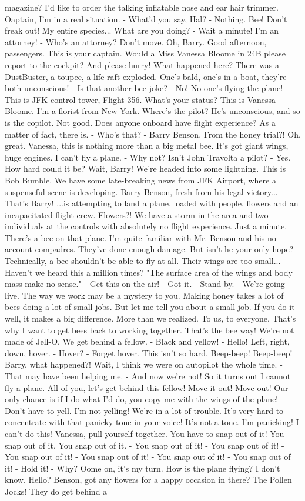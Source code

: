 \documentclass{article}
\begin{document}
magazine? I'd like to order the talking inflatable nose and ear hair trimmer. Oaptain, I'm in a real situation. - What'd you say, Hal? - Nothing. Bee! Don't freak out! My entire species... What are you doing? - Wait a minute! I'm an attorney! - Who's an attorney? Don't move. Oh, Barry. Good afternoon, passengers. This is your captain. Would a Miss Vanessa Bloome in 24B please report to the cockpit? And please hurry! What happened here? There was a DustBuster, a toupee, a life raft exploded. One's bald, one's in a boat, they're both unconscious! - Is that another bee joke? - No! No one's flying the plane! This is JFK control tower, Flight 356. What's your status? This is Vanessa Bloome. I'm a florist from New York. Where's the pilot? He's unconscious, and so is the copilot. Not good. Does anyone onboard have flight experience? As a matter of fact, there is. - Who's that? - Barry Benson. From the honey trial?! Oh, great. Vanessa, this is nothing more than a big metal bee. It's got giant wings, huge engines. I can't fly a plane. - Why not? Isn't John Travolta a pilot? - Yes. How hard could it be? Wait, Barry! We're headed into some lightning. This is Bob Bumble. We have some late-breaking news from JFK Airport, where a suspenseful scene is developing. Barry Benson, fresh from his legal victory... That's Barry! ...is attempting to land a plane, loaded with people, flowers and an incapacitated flight crew. Flowers?! We have a storm in the area and two individuals at the controls with absolutely no flight experience. Just a minute. There's a bee on that plane. I'm quite familiar with Mr. Benson and his no-account compadres. They've done enough damage. But isn't he your only hope? Technically, a bee shouldn't be able to fly at all. Their wings are too small... Haven't we heard this a million times? "The surface area of the wings and body mass make no sense." - Get this on the air! - Got it. - Stand by. - We're going live. The way we work may be a mystery to you. Making honey takes a lot of bees doing a lot of small jobs. But let me tell you about a small job. If you do it well, it makes a big difference. More than we realized. To us, to everyone. That's why I want to get bees back to working together. That's the bee way! We're not made of Jell-O. We get behind a fellow. - Black and yellow! - Hello! Left, right, down, hover. - Hover? - Forget hover. This isn't so hard. Beep-beep! Beep-beep! Barry, what happened?! Wait, I think we were on autopilot the whole time. - That may have been helping me. - And now we're not! So it turns out I cannot fly a plane. All of you, let's get behind this fellow! Move it out! Move out! Our only chance is if I do what I'd do, you copy me with the wings of the plane! Don't have to yell. I'm not yelling! We're in a lot of trouble. It's very hard to concentrate with that panicky tone in your voice! It's not a tone. I'm panicking! I can't do this! Vanessa, pull yourself together. You have to snap out of it! You snap out of it. You snap out of it. - You snap out of it! - You snap out of it! - You snap out of it! - You snap out of it! - You snap out of it! - You snap out of it! - Hold it! - Why? Oome on, it's my turn. How is the plane flying? I don't know. Hello? Benson, got any flowers for a happy occasion in there? The Pollen Jocks! They do get behind a 
\end{document}
